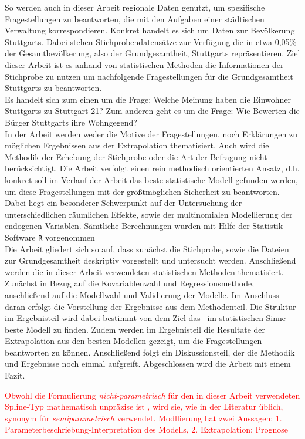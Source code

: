 \documentclass{Vorlage}
\begin{document}
So werden auch in dieser Arbeit regionale Daten genutzt, um spezifische Fragestellungen zu beantworten, die mit den Aufgaben einer städtischen Verwaltung korrespondieren. Konkret handelt es sich um Daten zur Bevölkerung Stuttgarts. Dabei stehen Stichprobendatensätze zur Verfügung die in etwa 0,05\% der Gesamtbevölkerung, also der Grundgesamtheit, Stuttgarts repräsentieren. Ziel dieser Arbeit ist es anhand von statistischen Methoden die Informationen der Stichprobe zu nutzen um nachfolgende Fragestellungen für die Grundgesamtheit Stuttgarts zu beantworten.\\
Es handelt sich zum einen um die Frage: Welche Meinung haben die Einwohner Stuttgarts zu Stuttgart 21? Zum anderen geht es um die Frage: Wie Bewerten die Bürger Stuttgarts ihre Wohngegend?\\
In der Arbeit werden weder die Motive der Fragestellungen, noch Erklärungen zu möglichen Ergebnissen aus der Extrapolation thematisiert. Auch wird die Methodik der Erhebung der Stichprobe oder die Art der Befragung nicht berücksichtigt. Die Arbeit verfolgt einen rein methodisch orientierten Ansatz, d.h. konkret soll im Verlauf der Arbeit das beste statistische Modell gefunden werden, um diese Fragestellungen mit der größtmöglichen Sicherheit zu beantworten. Dabei liegt ein besonderer Schwerpunkt auf der Untersuchung der unterschiedlichen räumlichen Effekte, sowie der multinomialen Modellierung der endogenen Variablen. Sämtliche Berechnungen wurden mit Hilfe der Statistik Software \texttt{R} vorgenommen \cite{RCore} \\
Die Arbeit gliedert sich so auf, dass zunächst die Stichprobe, sowie die Dateien zur Grundgesamtheit deskriptiv vorgestellt und untersucht werden. Anschließend werden die in dieser Arbeit verwendeten statistischen Methoden thematisiert. Zunächst in Bezug auf die Kovariablenwahl und Regressionsmethode, anschließend auf die Modellwahl und Validierung der Modelle. Im Anschluss daran erfolgt die Vorstellung der Ergebnisse aus dem Methodenteil. Die Struktur im Ergebnisteil wird dabei bestimmt von dem Ziel das --im statistischen Sinne-- beste Modell zu finden. Zudem werden im Ergebnisteil die Resultate der Extrapolation aus den besten Modellen gezeigt, um die Fragestellungen beantworten zu können. Anschließend folgt ein Diskussionsteil, der die Methodik und Ergebnisse noch einmal aufgreift. Abgeschlossen wird die Arbeit mit einem Fazit.

\textcolor{red}{Obwohl die Formulierung \textit{nicht-parametrisch} für den in dieser Arbeit verwendeten Spline-Typ mathematisch unpräzise ist \cite[p. 1]{eilers1996}, wird sie, wie in der Literatur üblich, synonym für \textit{semiparametrisch} verwendet.
Modllierung hat zwei Aussagen: 1. Parameterbeschriebung-Interpretation des Modells, 2. Extrapolation: Prognose}
\end{document}
